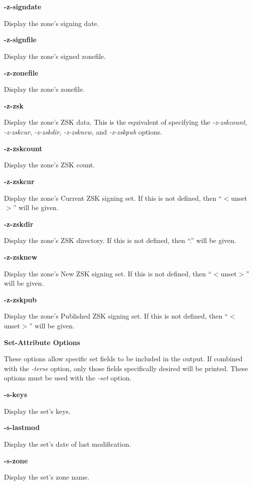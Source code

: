 \begin{description}
\item {\bf -z-signdate}\verb" "

Display the zone's signing date.

\item {\bf -z-signfile}\verb" "

Display the zone's signed zonefile.

\item {\bf -z-zonefile}\verb" "

Display the zone's zonefile.

\item {\bf -z-zsk}\verb" "

Display the zone's ZSK data.  This is the equivalent of specifying the
{\it -z-zskcount}, {\it -z-zskcur}, {\it -z-zskdir}, {\it -z-zsknew},
and {\it -z-zskpub} options.

\item {\bf -z-zskcount}\verb" "

Display the zone's ZSK count.

\item {\bf -z-zskcur}\verb" "

Display the zone's Current ZSK signing set.
If this is not defined, then ``$<$unset$>$'' will be given.

\item {\bf -z-zskdir}\verb" "

Display the zone's ZSK directory.
If this is not defined, then ``.'' will be given.

\item {\bf -z-zsknew}\verb" "

Display the zone's New ZSK signing set.
If this is not defined, then ``$<$unset$>$'' will be given.

\item {\bf -z-zskpub}\verb" "

Display the zone's Published ZSK signing set.
If this is not defined, then ``$<$unset$>$'' will be given.

\end{description}

{\bf Set-Attribute Options}

These options allow specific set fields to be included in the output.  If
combined with the {\it -terse} option, only those fields specifically desired
will be printed.  These options must be used with the {\it -set} option.

\begin{description}

\item {\bf -s-keys}\verb" "

Display the set's keys.

\item {\bf -s-lastmod}\verb" "

Display the set's date of last modification.

\item {\bf -s-zone}\verb" "

Display the set's zone name.

\end{description}

